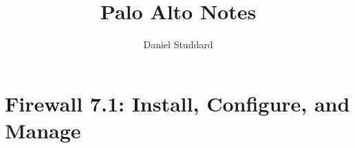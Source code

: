 \documentclass{report}
\author{Daniel Studdard}
\begin{document}
\title{Palo Alto Notes}
\maketitle
\tableofcontents

\chapter{Firewall 7.1: Install, Configure, and Manage}



\end{document}
